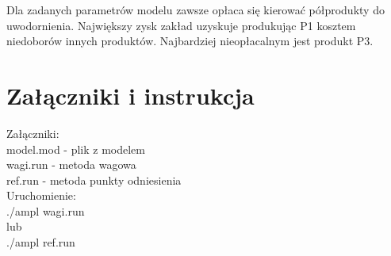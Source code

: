 \documentclass[a4paper, 10pt]{article}
\begin{document}
\begin{landscape}
\begin{center}
\begin{tabular}{ | l | c | c | c | c | c | c | c | c |c |}
	 
    \end{tabular}
\end{center}

Dla zadanych parametrów modelu zawsze opłaca się kierować półprodukty do uwodornienia. Największy zysk zakład uzyskuje produkując P1 kosztem niedoborów innych produktów. Najbardziej nieopłacalnym jest produkt P3.




\end{landscape}

\section{Załączniki i instrukcja}

Załączniki:\\
model.mod - plik z modelem\\
wagi.run - metoda wagowa\\
ref.run - metoda punkty odniesienia\\

Uruchomienie:\\
./ampl wagi.run\\
lub \\
./ampl ref.run\\
\end{document}
